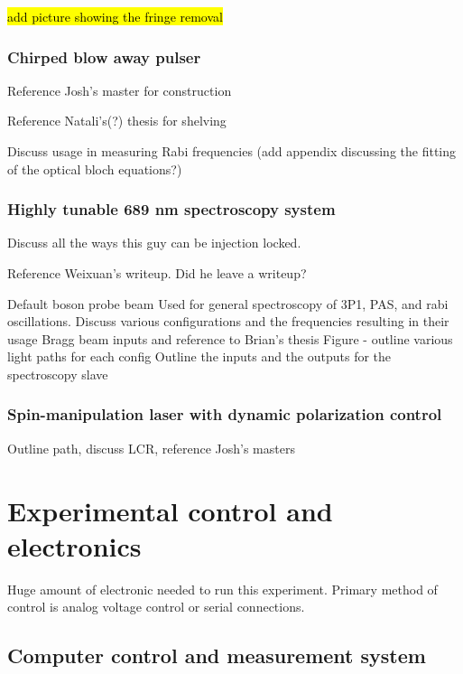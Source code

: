 \hl{add picture showing the fringe removal}

\subsubsection{Chirped blow away pulser}



Reference Josh's master for construction

Reference Natali's(?) thesis for shelving

Discuss usage in measuring Rabi frequencies (add appendix discussing the fitting of the optical bloch equations?)

\subsubsection{Highly tunable 689 nm spectroscopy system}

Discuss all the ways this guy can be injection locked.

Reference Weixuan's writeup. Did he leave a writeup?

Default boson probe beam
	Used for general spectroscopy of 3P1, PAS, and rabi oscillations.
Discuss various configurations and the frequencies resulting in their usage
Bragg beam inputs and reference to Brian’s thesis
Figure - outline various light paths for each config
Outline the inputs and the outputs for the spectroscopy slave


\subsubsection{Spin-manipulation laser with dynamic polarization control}

Outline path, discuss LCR, reference Josh's masters

\section{Experimental control and electronics} \label{sec:electronics}

Huge amount of electronic needed to run this experiment. Primary method of control is analog voltage control or serial connections. 

\subsection{Computer control and measurement system} \label{ssec:comp_sys}

